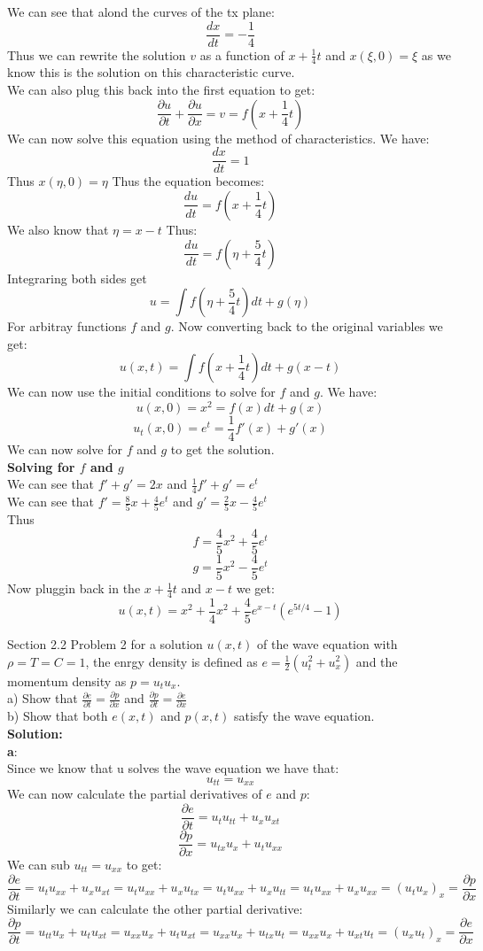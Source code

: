 \documentclass[answers,12pt,addpoints]{exam}
\begin{document}
\begin{questions}
We can see that alond the curves of the tx plane:
$$ \frac{dx}{dt} = -\frac{1}{4}$$
Thus we can rewrite the solution $v$ as a function of $x + \frac{1}{4}t$ and $x(\xi, 0) = \xi$ as we know this is the solution on this characteristic curve.\\
We can also plug this back into the first equation to get:
$$ \frac{\partial u}{\partial t} + \frac{\partial u}{\partial x} = v = f(x + \frac{1}{4}t)$$
We can now solve this equation using the method of characteristics. We have:
$$ \frac{dx}{dt} = 1$$
Thus $x(\eta, 0) = \eta$ Thus the equation becomes:
$$ \frac{du}{dt} = f(x+\frac{1}{4}t)$$
We also know that $\eta = x -t$ Thus:
$$ \frac{du}{dt} = f(\eta + \frac{5}{4}t)$$
Integraring both sides get
$$ u = \int f(\eta + \frac{5}{4}t) dt + g(\eta)$$
For arbitray functions $f$ and $g$. 
Now converting back to the original variables we get:
$$ u(x,t) = \int f(x + \frac{1}{4}t) dt + g(x-t)$$
We can now use the initial conditions to solve for $f$ and $g$. We have:
$$ u(x,0) = x^2 = f(x) dt + g(x)$$
$$ u_t(x,0) = e^t = \frac{1}{4}f'(x) + g'(x)$$
We can now solve for $f$ and $g$ to get the solution.\\
\textbf{Solving for $f$ and $g$}\\
We can see that $f' +g' = 2x$ and $\frac{1}{4}f' + g' = e^t$\\
We can see that $f'  = \frac{8}{5}x + \frac{4}{5}e^t$ and $g' = \frac{2}{5}x - \frac{4}{5}e^t$\\
Thus
$$ f = \frac{4}{5}x^2 + \frac{4}{5}e^t $$
$$ g = \frac{1}{5}x^2 - \frac{4}{5}e^t $$
Now pluggin back in the $x + \frac{1}{4}t$ and $x -t$ we get:
$$u(x,t) = x^2 +\frac{1}{4}x^2 + \frac{4}{5}e^{x-t}(e^{5t/4}-1)$$

\question Section 2.2 Problem 2
for a solution $u(x,t)$ of the wave equation with $\rho = T = C = 1$, the enrgy density is defined as $e = \frac{1}{2}(u_t^2 + u_x^2)$ and the momentum density as $p = u_t u_x$. \\
a) Show that $\frac{\partial e}{\partial t} = \frac{\partial p}{\partial x}$ and $\frac{\partial p}{\partial t} = \frac{\partial e}{\partial x}$\\
b) Show that both $e(x,t)$ and $p(x,t)$ satisfy the wave equation.\\
\textbf{Solution:}\\
\textbf{a}:\\
Since we know that u solves the wave equation we have that:
$$ u_{tt} = u_{xx}$$
We can now calculate the partial derivatives of $e$ and $p$:
$$ \frac{\partial e}{\partial t} = u_t u_{tt} + u_x u_{xt}$$
$$ \frac{\partial p}{\partial x} = u_{tx} u_x + u_t u_{xx}$$
We can sub $u_{tt} = u_{xx}$ to get:
$$ \frac{\partial e}{\partial t} = u_t u_{xx} + u_x u_{xt} = u_t u_{xx} + u_x u_{tx} = u_t u_{xx} + u_x u_{tt} = u_t u_{xx} + u_x u_{xx} = (u_t u_x)_x = \frac{\partial p}{\partial x}$$
Similarly we can calculate the other partial derivative:
$$ \frac{\partial p}{\partial t} = u_{tt} u_x + u_t u_{xt} = u_{xx} u_x + u_t u_{xt} = u_{xx} u_x + u_{tx} u_t = u_{xx} u_x + u_{xt} u_t = (u_x u_t)_x = \frac{\partial e}{\partial x}$$


\end{questions}
\end{document}
